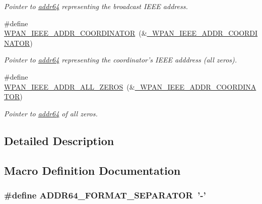 \begin{DoxyCompactItemize}
\begin{DoxyCompactList}\small\item\em Pointer to {\ttfamily \hyperlink{unionaddr64}{addr64}} representing the broadcast I\-E\-E\-E address. \end{DoxyCompactList}\item 
\#define \hyperlink{group__wpan__types_ga816199ef85ef801e07ae48350664034d}{W\-P\-A\-N\-\_\-\-I\-E\-E\-E\-\_\-\-A\-D\-D\-R\-\_\-\-C\-O\-O\-R\-D\-I\-N\-A\-T\-O\-R}~(\&\hyperlink{group__wpan__types_gac6bb0830c58428d2789507a23ab9fcdd}{\-\_\-\-W\-P\-A\-N\-\_\-\-I\-E\-E\-E\-\_\-\-A\-D\-D\-R\-\_\-\-C\-O\-O\-R\-D\-I\-N\-A\-T\-O\-R})
\begin{DoxyCompactList}\small\item\em Pointer to {\ttfamily \hyperlink{unionaddr64}{addr64}} representing the coordinator's I\-E\-E\-E adddress (all zeros). \end{DoxyCompactList}\item 
\#define \hyperlink{group__wpan__types_ga014f9d0857312b6a7f80ee10ecfd0935}{W\-P\-A\-N\-\_\-\-I\-E\-E\-E\-\_\-\-A\-D\-D\-R\-\_\-\-A\-L\-L\-\_\-\-Z\-E\-R\-O\-S}~(\&\hyperlink{group__wpan__types_gac6bb0830c58428d2789507a23ab9fcdd}{\-\_\-\-W\-P\-A\-N\-\_\-\-I\-E\-E\-E\-\_\-\-A\-D\-D\-R\-\_\-\-C\-O\-O\-R\-D\-I\-N\-A\-T\-O\-R})
\begin{DoxyCompactList}\small\item\em Pointer to {\ttfamily \hyperlink{unionaddr64}{addr64}} of all zeros. \end{DoxyCompactList}\end{DoxyCompactItemize}


\subsection{Detailed Description}


\subsection{Macro Definition Documentation}
\hypertarget{group__wpan__types_ga806a2554dd5d8a154d23b13b9cf72141}{
\subsubsection[{A\-D\-D\-R64\-\_\-\-F\-O\-R\-M\-A\-T\-\_\-\-S\-E\-P\-A\-R\-A\-T\-O\-R}]{\setlength{\rightskip}{0pt plus 5cm}\#define A\-D\-D\-R64\-\_\-\-F\-O\-R\-M\-A\-T\-\_\-\-S\-E\-P\-A\-R\-A\-T\-O\-R~'-\/'}}\label{group__wpan__types_ga806a2554dd5d8a154d23b13b9cf72141}


